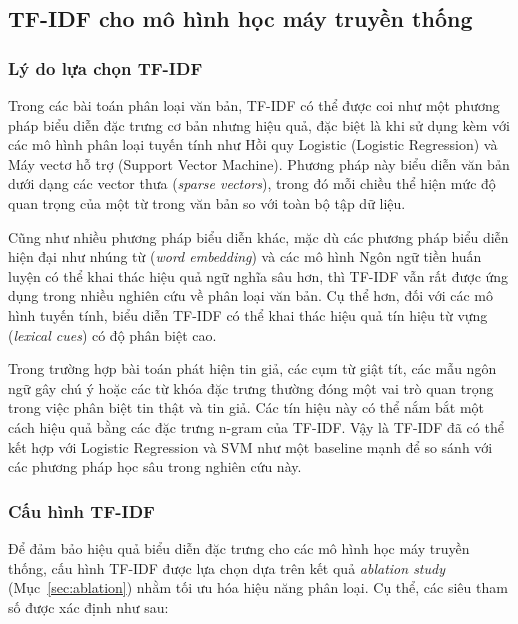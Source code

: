 \documentclass[12pt, a4paper]{report}
\begin{document}
\subsection{TF-IDF cho mô hình học máy truyền thống}

\subsubsection{Lý do lựa chọn TF-IDF}

Trong các bài toán phân loại văn bản, TF-IDF có thể được coi như một phương pháp biểu diễn đặc trưng cơ bản nhưng hiệu quả, đặc biệt là khi sử dụng kèm với các mô hình phân loại tuyến tính như Hồi quy Logistic (Logistic Regression) và Máy vectơ hỗ trợ (Support Vector Machine). Phương pháp này biểu diễn văn bản dưới dạng các vector thưa (\textit{sparse vectors}), trong đó mỗi chiều thể hiện mức độ quan trọng của một từ trong văn bản so với toàn bộ tập dữ liệu.

Cũng như nhiều phương pháp biểu diễn khác, mặc dù các phương pháp biểu diễn hiện đại như nhúng từ (\textit{word embedding}) và các mô hình Ngôn ngữ tiền huấn luyện có thể khai thác hiệu quả ngữ nghĩa sâu hơn, thì TF-IDF vẫn rất được ứng dụng trong nhiều nghiên cứu về phân loại văn bản. Cụ thể hơn, đối với các mô hình tuyến tính, biểu diễn TF-IDF có thể khai thác hiệu quả tín hiệu từ vựng (\textit{lexical cues}) có độ phân biệt cao.

Trong trường hợp bài toán phát hiện tin giả, các cụm từ giật tít, các mẫu ngôn ngữ gây chú ý hoặc các từ khóa đặc trưng thường đóng một vai trò quan trọng trong việc phân biệt tin thật và tin giả. Các tín hiệu này có thể nắm bắt một cách hiệu quả bằng các đặc trưng n-gram của TF-IDF. Vậy là TF-IDF đã có thể kết hợp với Logistic Regression và SVM như một baseline mạnh để so sánh với các phương pháp học sâu trong nghiên cứu này.

\subsubsection{Cấu hình TF-IDF}

Để đảm bảo hiệu quả biểu diễn đặc trưng cho các mô hình học máy truyền
thống, cấu hình TF-IDF được lựa chọn dựa trên kết quả \textit{ablation
study} (Mục~\ref{sec:ablation}) nhằm tối ưu hóa hiệu năng phân loại.
Cụ thể, các siêu tham số được xác định như sau:
\end{document}
